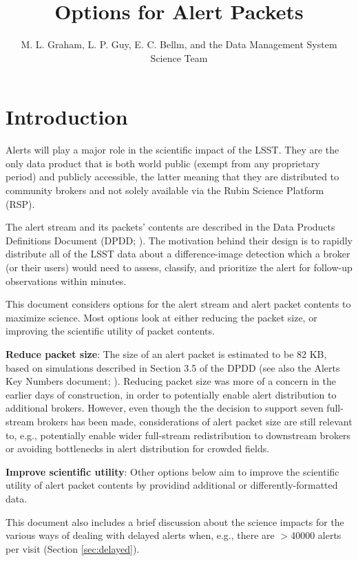 \documentclass[DM,authoryear,toc]{lsstdoc}
\title{Options for Alert Packets}
\author{%
M. L. Graham, L. P. Guy, E. C. Bellm, and the Data Management System Science Team
}
\date{\vcsDate}
\begin{document}
\maketitle


\section{Introduction}\label{sec:introduction}

Alerts will play a major role in the scientific impact of the LSST.
They are the only data product that is both world public (exempt from any proprietary period) and publicly accessible,
the latter meaning that they are distributed to community brokers and not solely available via the Rubin Science Platform (RSP).

The alert stream and its packets' contents are described in the Data Products Definitions Document (DPDD; ).
The motivation behind their design is to rapidly distribute all of the LSST data about a difference-image detection which a 
broker (or their users) would need to assess, classify, and prioritize the alert for follow-up observations within minutes.

This document considers options for the alert stream and alert packet contents to maximize science.
Most options look at either reducing the packet size, or improving the scientific utility of packet contents.

\textbf{Reduce packet size}:
The size of an alert packet is estimated to be 82 KB, based on simulations described in Section 3.5 of the DPDD 
(see also the Alerts Key Numbers document; ).
Reducing packet size was more of a concern in the earlier days of construction, in order to potentially enable alert 
distribution to additional brokers.
However, even though the the decision to support seven full-stream brokers has been made, considerations of alert packet 
size are still relevant to, e.g., potentially enable wider full-stream redistribution to downstream brokers or avoiding 
bottlenecks in alert distribution for crowded fields.

\textbf{Improve scientific utility}:
Other options below aim to improve the scientific utility of alert packet contents by providind additional or 
differently-formatted data.

This document also includes a brief discussion about the science impacts for the various ways of dealing with 
delayed alerts when, e.g., there are $>$40000 alerts per visit (Section \ref{sec:delayed}).
\end{document}
